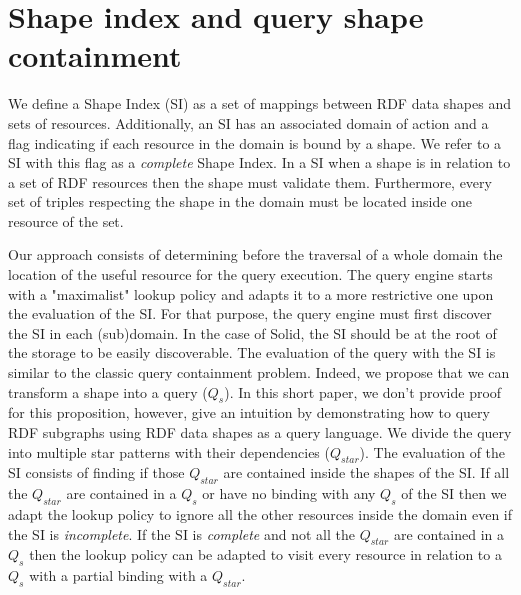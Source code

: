 \section{Shape index and query shape containment}

We define a Shape Index (SI) as a set of mappings between RDF data shapes and sets of resources.
Additionally, an SI has an associated domain of action
and a flag indicating if each resource in the domain is bound by a shape. 
We refer to a SI with this flag as a \emph{complete} Shape Index.
In a SI when a shape is in relation to a set of RDF resources then the shape must validate them.
Furthermore, every set of triples respecting the shape in the domain must be located inside one resource of the set.

Our approach consists of determining before the traversal of a whole domain the location of the useful resource for the query execution.
The query engine starts with a "maximalist" lookup policy and adapts it to a more restrictive one upon the evaluation of the SI.
For that purpose, the query engine must first discover the SI in each (sub)domain.
In the case of Solid, the SI should be at the root of the storage to be easily discoverable.
The evaluation of the query with the SI is similar to the classic query containment problem.
Indeed, we propose that we can transform a shape into a query ($Q_{s}$).
In this short paper, we don't provide proof for this proposition, however, 
\citeauthor{Delva2021} give an intuition by demonstrating how to query RDF subgraphs using RDF data shapes as a query language.
We divide the query into multiple star patterns with their dependencies ($Q_{star}$).
The evaluation of the SI consists of finding if those $Q_{star}$ are contained inside the shapes of the SI.
If all the $Q_{star}$ are contained in a $Q_{s}$ or have no binding with any $Q_{s}$ of the SI
then we adapt the lookup policy to ignore all the other resources inside the domain even if the SI is \emph{incomplete}.
If the SI is \emph{complete} and not all the $Q_{star}$ are contained in a $Q_{s}$ then the lookup policy can be adapted
to visit every resource in relation to a $Q_{s}$ with a partial binding with a $Q_{star}$.
